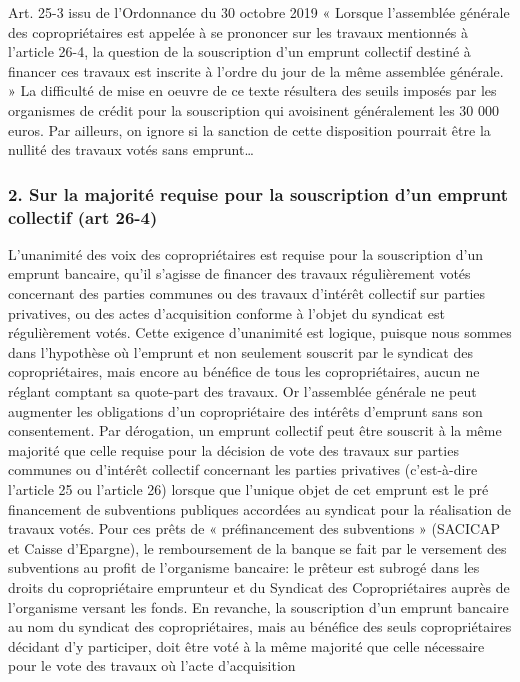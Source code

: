 			Art. 25-3 issu de l’Ordonnance du 30 octobre 2019 « Lorsque l'assemblée générale des copropriétaires est appelée à se prononcer sur les travaux mentionnés à l'article 26-4, la question de la souscription d'un emprunt collectif destiné à financer ces travaux est inscrite à l'ordre du jour de la même assemblée générale. »
			La difficulté de mise en oeuvre de ce texte résultera des seuils imposés par les organismes de crédit pour la souscription qui avoisinent généralement les 30 000 euros. Par ailleurs, on ignore si la sanction de cette disposition pourrait être la nullité des travaux votés sans emprunt…
		
		\subsubsection{2. Sur la majorité requise pour la souscription d'un emprunt collectif (art 26-4)}
		
			L'unanimité des voix des copropriétaires est requise pour la souscription d'un emprunt bancaire, qu'il s'agisse de financer des travaux régulièrement votés concernant des parties communes ou des travaux d'intérêt collectif sur parties privatives, ou des actes d'acquisition conforme à l'objet du syndicat est régulièrement votés.
			Cette exigence d'unanimité est logique, puisque nous sommes dans l'hypothèse où l'emprunt et non seulement souscrit par le syndicat des copropriétaires, mais encore au bénéfice de tous les copropriétaires, aucun ne réglant comptant sa quote-part des travaux. Or l'assemblée générale ne peut augmenter les obligations d'un copropriétaire des intérêts d'emprunt sans son consentement.
			Par dérogation, un emprunt collectif peut être souscrit à la même majorité que celle requise pour la décision de vote des travaux sur parties communes ou d'intérêt collectif concernant les parties privatives (c'est-à-dire l'article 25 ou l'article 26) lorsque que l'unique objet de cet emprunt est le pré financement de subventions publiques accordées au syndicat pour la réalisation de travaux votés.
			Pour ces prêts de « préfinancement des subventions » (SACICAP et Caisse d’Epargne), le remboursement de la banque se fait par le versement des subventions au profit de l’organisme bancaire: le prêteur est subrogé dans les droits du copropriétaire emprunteur et du Syndicat des Copropriétaires auprès de l’organisme versant les fonds.
			En revanche, la souscription d’un emprunt bancaire au nom du syndicat des copropriétaires, mais au bénéfice des seuls copropriétaires décidant d’y participer, doit être voté à la même majorité que celle nécessaire pour le vote des travaux où l'acte d'acquisition
		
